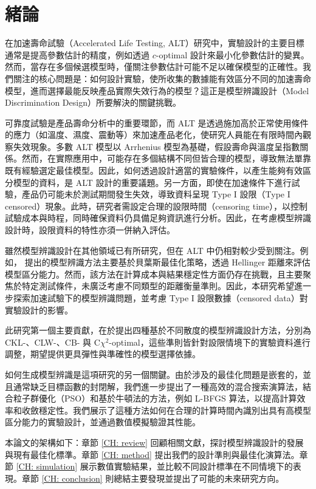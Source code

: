 \chapter{緒論 \label{CH: intro}}

\hspace*{8mm} 在加速壽命試驗（Accelerated Life Testing, ALT）研究中，實驗設計的主要目標通常是提高參數估計的精度，例如透過 $c$-optimal 設計來最小化參數估計的變異。然而，當存在多個候選模型時，僅關注參數估計可能不足以確保模型的正確性。我們關注的核心問題是：如何設計實驗，使所收集的數據能有效區分不同的加速壽命模型，進而選擇最能反映產品實際失效行為的模型？這正是模型辨識設計（Model Discrimination Design）所要解決的關鍵挑戰。

\hspace*{8mm} 可靠度試驗是產品壽命分析中的重要環節，而 ALT 是透過施加高於正常使用條件的應力（如溫度、濕度、震動等）來加速產品老化，使研究人員能在有限時間內觀察失效現象。多數 ALT 模型以 Arrhenius 模型為基礎，假設壽命與溫度呈指數關係。然而，在實際應用中，可能存在多個結構不同但皆合理的模型，導致無法單靠既有經驗選定最佳模型。因此，如何透過設計適當的實驗條件，以產生能夠有效區分模型的資料，是 ALT 設計的重要議題。另一方面，即使在加速條件下進行試驗，產品仍可能未於測試期間發生失效，導致資料呈現 Type I 設限（Type I censored）現象。此時，研究者需設定合理的設限時間（censoring time），以控制試驗成本與時程，同時確保資料仍具備足夠資訊進行分析。因此，在考慮模型辨識設計時，設限資料的特性亦須一併納入評估。

\hspace*{8mm} 雖然模型辨識設計在其他領域已有所研究，但在 ALT 中仍相對較少受到關注。例如，\cite{nasir2015simulation} 提出的模型辨識方法主要基於貝葉斯最佳化策略，透過 Hellinger 距離來評估模型區分能力。然而，該方法在計算成本與結果穩定性方面仍存在挑戰，且主要聚焦於特定測試條件，未廣泛考慮不同類型的距離衡量準則。因此，本研究希望進一步探索加速試驗下的模型辨識問題，並考慮 Type I 設限數據（censored data）對實驗設計的影響。

\hspace*{8mm} 此研究第一個主要貢獻，在於提出四種基於不同散度的模型辨識設計方法，分別為 CKL-、CLW-、CB- 與 C$\chi^2$-optimal，這些準則皆針對設限情境下的實驗資料進行調整，期望提供更具彈性與準確性的模型選擇依據。

\hspace*{8mm} 如何生成模型辨識是這項研究的另一個關鍵。由於涉及的最佳化問題是嵌套的，並且通常缺乏目標函數的封閉解，我們進一步提出了一種高效的混合搜索演算法，結合粒子群優化（PSO）和基於牛頓法的方法，例如 L-BFGS 算法，以提高計算效率和收斂穩定性。我們展示了這種方法如何在合理的計算時間內識別出具有高模型區分能力的實驗設計，並通過數值模擬驗證其性能。

\hspace*{8mm} 本論文的架構如下：章節 \ref{CH: review} 回顧相關文獻，探討模型辨識設計的發展與現有最佳化標準。章節 \ref{CH: method} 提出我們的設計準則與最佳化演算法。章節 \ref{CH: simulation} 展示數值實驗結果，並比較不同設計標準在不同情境下的表現。章節 \ref{CH: conclusion} 則總結主要發現並提出了可能的未來研究方向。